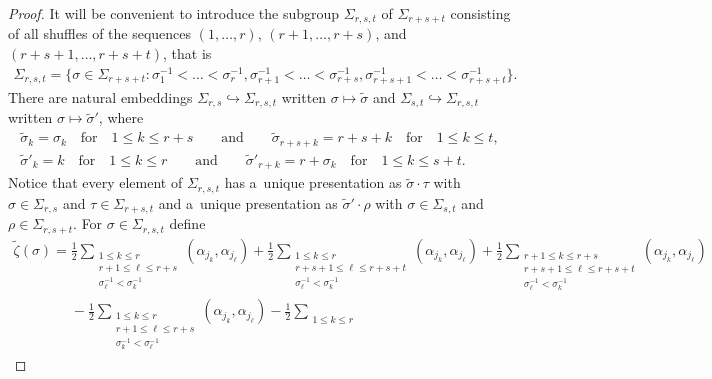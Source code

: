 \begin{proof}
It will be convenient to introduce the subgroup $\Sigma_{r,s,t}$ of $\Sigma_{r+s+t}$ consisting of all shuf\/f\/les of the
sequences $(1,\ldots,r)$, $(r+1,\ldots,r+s)$, and $(r+s+1,\ldots,r+s+t)$, that is
\begin{gather*}
\Sigma_{r,s,t}=\big\{\sigma\in\Sigma_{r+s+t}: \sigma^{-1}_1<\dots<\sigma^{-1}_r, \sigma^{-1}_{r+1}<\dots<\sigma^{-1}_{r+s},
\sigma^{-1}_{r+s+1}<\dots<\sigma^{-1}_{r+s+t}\big\}.
\end{gather*}
There are natural embeddings $\Sigma_{r,s}\hookrightarrow\Sigma_{r,s,t}$ written $\sigma\mapsto\widetilde\sigma$ and
$\Sigma_{s,t}\hookrightarrow\Sigma_{r,s,t}$ written $\sigma\mapsto\widetilde\sigma'$, where
\begin{gather*}
\widetilde\sigma_k=\sigma_k
\quad
\text{for}
\quad
1\le k\le r+s
\qquad
\text{and}
\qquad
\widetilde\sigma_{r+s+k}=r+s+k
\quad
\text{for}
\quad
1\le k\le t,
\\
\widetilde\sigma'_k=k
\quad
\text{for}
\quad
1\le k\le r
\qquad
\text{and}
\qquad
\widetilde\sigma'_{r+k}=r+\sigma_k
\quad
\text{for}
\quad
1\le k\le s+t.
\end{gather*}
Notice that every element of $\Sigma_{r,s,t}$ has a~unique presentation as $\widetilde\sigma\cdot\tau$ with
$\sigma\in\Sigma_{r,s}$ and $\tau\in\Sigma_{r+s,t}$ and a~unique presentation as $\widetilde\sigma'\cdot\rho$ with
$\sigma\in\Sigma_{s,t}$ and $\rho\in\Sigma_{r,s+t}$.
For $\sigma\in\Sigma_{r,s,t}$ def\/ine
\begin{gather*}
\widetilde\zeta(\sigma)=\frac{1}{2}\sum\limits_{\substack{1\le k\le r
\\
r+1\le\ell\le r+s
\\
\sigma_\ell^{-1}<\sigma_k^{-1}}}(\alpha_{j_k},\alpha_{j_\ell}) +\frac{1}{2}\sum\limits_{\substack{1\le k\le r
\\
r+s+1\le\ell\le r+s+t
\\
\sigma_\ell^{-1}<\sigma_k^{-1}}}(\alpha_{j_k},\alpha_{j_\ell}) +\frac{1}{2}\sum\limits_{\substack{r+1\le k\le r+s
\\
r+s+1\le\ell\le r+s+t
\\
\sigma_\ell^{-1}<\sigma_k^{-1}}}(\alpha_{j_k},\alpha_{j_\ell})
\\
\phantom{\widetilde\zeta(\sigma)=}{}
 -\frac{1}{2}\sum\limits_{\substack{1\le k\le r
\\
r+1\le\ell\le r+s
\\
\sigma_k^{-1}<\sigma_\ell^{-1}}}(\alpha_{j_k},\alpha_{j_\ell}) -\frac{1}{2}\sum\limits_{\substack{1\le k\le r
}}
\end{gather*}
\end{proof}
